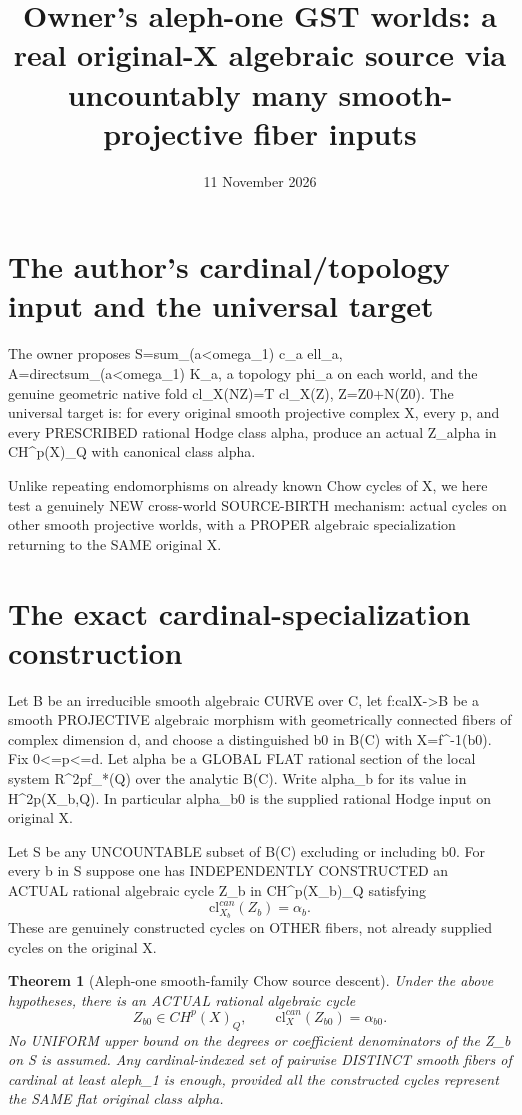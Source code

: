 \documentclass[11pt]{article}
\title{Owner's aleph-one GST worlds: a real original-X algebraic source via uncountably many smooth-projective fiber inputs}
\date{11 November 2026}
\newtheorem{theorem}{Theorem}
\begin{document}
\maketitle

\section{The author's cardinal/topology input and the universal target}
The owner proposes S=sum_(a<omega_1) c_a ell_a,
A=directsum_(a<omega_1) K_a,
a topology phi_a on each world, and the genuine
geometric native fold cl_X(NZ)=T cl_X(Z),
Z=Z0+N(Z0).
The universal target is: for every original
smooth projective complex X, every p, and every
PRESCRIBED rational Hodge class alpha,
produce an actual Z_alpha in CH^p(X)_Q
with canonical class alpha.

Unlike repeating endomorphisms on already known Chow
cycles of X, we here test a genuinely NEW
cross-world SOURCE-BIRTH mechanism: actual cycles
on other smooth projective worlds, with a
PROPER algebraic specialization returning to
the SAME original X.

\section{The exact cardinal-specialization construction}
Let B be an irreducible smooth algebraic CURVE over C,
let f:calX->B be a smooth PROJECTIVE algebraic morphism
with geometrically connected fibers of complex
dimension d, and choose a distinguished
b0 in B(C) with X=f^{-1}(b0).
Fix 0<=p<=d. Let
alpha be a GLOBAL FLAT rational section
of the local system R^{2p}f_*(Q) over
the analytic B(C). Write alpha_b for
its value in H^{2p}(X_b,Q).
In particular alpha_b0 is the supplied
rational Hodge input on original X.

Let S be any UNCOUNTABLE subset of
B(C) excluding or including b0.
For every b in S suppose one has
INDEPENDENTLY CONSTRUCTED an ACTUAL
rational algebraic cycle
Z_b in CH^p(X_b)_Q satisfying
\[
\boxed{\mathrm{cl}^{can}_{X_b}(Z_b)=\alpha_b.}
\]
These are genuinely constructed cycles on
OTHER fibers, not already supplied cycles on
the original X.

\begin{theorem}[Aleph-one smooth-family Chow source descent]
Under the above hypotheses, there is an
ACTUAL rational algebraic cycle
\[
\boxed{Z_{b0}\in CH^p(X)_Q,\qquad
\mathrm{cl}^{can}_X(Z_{b0})=\alpha_{b0}.}
\]
No UNIFORM upper bound on the degrees or
coefficient denominators of the Z_b on S
is assumed.
Any cardinal-indexed set of pairwise
DISTINCT smooth fibers of cardinal at least
aleph_1 is enough, provided all the
constructed cycles represent the SAME
flat original class alpha.
\end{theorem}
\end{document}
